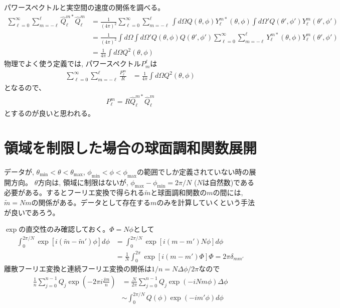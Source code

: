 \documentclass[a4j, 12pt]{ltjarticle}
\begin{document}
    パワースペクトルと実空間の速度の関係を調べる。
    \begin{align}
        \sum_{\ell=0}^\infty\sum_{m=-\ell}^\ell
        \widehat{Q}_\ell^{m*} \widehat{Q}_\ell^m
        &= \frac{1}{(4\pi)^2}\sum_{\ell=0}^\infty\sum_{m=-\ell}^\ell
        \int d\Omega Q(\theta,\phi) Y_\ell^{m*}(\theta,\phi)
        \int d\Omega' Q(\theta',\phi') Y_\ell^m(\theta',\phi') \nonumber\\
        & = \frac{1}{(4\pi)^2}\int d\Omega \int d\Omega' Q(\theta,\phi)Q(\theta',\phi')
        \sum_{\ell=0}^\infty\sum_{m=-\ell}^\ell Y_\ell^{m*}(\theta,\phi)Y_\ell^m(\theta',\phi') \nonumber\\
        & = \frac{1}{4\pi}\int d\Omega Q^2(\theta,\phi)
    \end{align}
    物理でよく使う定義では, パワースペクトル$P_m^\ell$は
    \begin{align}
        \sum_{\ell =0}^\infty \sum_{m=-\ell}^\ell \frac{P_\ell^m}{R}
        &= \frac{1}{4\pi}\int d\Omega Q^2(\theta,\phi) 
    \end{align}
    となるので、 
    \begin{align}
        P_\ell^m = R\widehat{Q}_\ell^{m*}\widehat{Q}_\ell^m
    \end{align}
    とするのが良いと思われる。
    \section{領域を制限した場合の球面調和関数展開}
    データが, $\theta_\mathrm{min}<\theta<\theta_\mathrm{max}$, $\phi_\mathrm{min}<\phi<\phi_\mathrm{max}$の範囲でしか定義されていない時の展開方向。
    $\theta$方向は, 領域に制限はないが, $\phi_\mathrm{max}-\phi_\mathrm{min}=2\pi/N$ ($N$は自然数)である必要がある。するとフーリエ変換で得られる$\tilde{m}$と球面調和関数の$m$の間には, $\tilde{m}=Nm$の関係がある。データとして存在する$m$のみを計算していくという手法が良いであろう。\par
    $\exp$の直交性のみ確認しておく。$\Phi = N\phi$として
    \begin{align}
        \int_0^{2\pi/N} \exp[i(\tilde{m}-\tilde{m}')\phi]d\phi
        &= \int_0^{2\pi/N} \exp[i(m-m')N\phi]d\phi \nonumber\\
        &= \frac{1}{N}\int_0^{2\pi} \exp[i(m-m')\Phi] \Phi = 2\pi \delta_{mm'}        
    \end{align}
    離散フーリエ変換と連続フーリエ変換の関係は$1/n=N\Delta \phi/2\pi$なので
    \begin{align}
        \frac{1}{n}\sum_{j=0}^{n-1}Q_j \exp\left(-2\pi i \frac{jm}{n}\right)
        &= \frac{N}{2\pi}\sum_{j=0}^{n-1}Q_j\exp\left(-iNm\phi \right) \Delta \phi \nonumber\\
        &\sim \int_0^{2\pi/N} Q(\phi) \exp(-im'\phi)d\phi
    \end{align}
\end{document}
